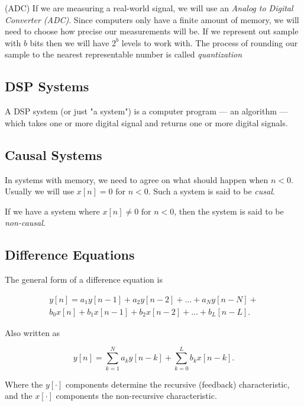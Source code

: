 \documentclass{article}
\def\lsqb{\left[}
\def\rsqb{\right]}
\def\sqb#1{\lsqb #1 \rsqb}
\begin{document}
\index(ADC)
If we are measuring a real-world signal, we will use an \textit{Analog to Digital Converter (ADC)}. Since computers only have a finite amount of memory, we will need to choose how precise our measurements will be. If we represent out sample with $b$ bits then we will have $2^b$ levels to work with. The process of rounding our sample to the nearest representable number is called \textit{quantization}

\subsection{DSP Systems}
A DSP system (or just "a system") is a computer program --- an algorithm --- which takes one or more digital signal and returns one or more digital signals.

\subsection{Causal Systems}
In systems with memory, we need to agree on what should happen when $n < 0$. Usually we will use $x\left[n\right] = 0 \text{ for } n < 0$. Such a system is said to be \textit{cusal}.

If we have a system where $x\left[n\right] \neq 0 \text{ for } n < 0$, then the system is said to be \textit{non-causal}.

\subsection{Difference Equations}
The general form of a difference equation is

\begin{equation}
\begin{split}
    y\sqb{n} = a_1 y\sqb{n - 1} + a_2 y\sqb{n-2} + \dots + a_N y\sqb{n-N} + \\
        b_0 x\sqb{n} + b_1 x\sqb{n - 1} + b_2 x\sqb{n - 2} + \dots + b_L\sqb{n - L}.
\end{split}
\end{equation}

Also written as

\begin{equation}
    y\sqb{n} = \sum_{k=1}^N a_k y\sqb{n - k} + \sum_{k=0}^L b_k x\sqb{n - k}.
\end{equation}

Where the $y\sqb{\cdot}$ components determine the recursive (feedback) characteristic, and the $x\sqb{\cdot}$ components the non-recursive characteristic.
\end{document}

